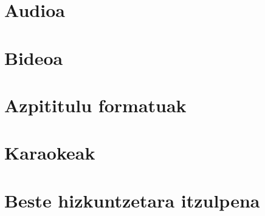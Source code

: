 
\section{Audioa}

\section{Bideoa}

\section{Azpititulu formatuak}

\section{Karaokeak}

\section{Beste hizkuntzetara itzulpena}
